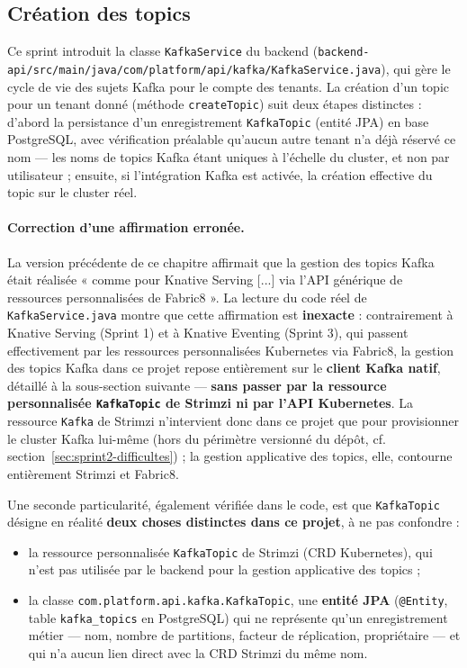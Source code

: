 \subsection{Création des topics}

Ce sprint introduit la classe \texttt{KafkaService} du backend (\texttt{backend-api/src/main/java/com/platform/api/kafka/KafkaService.java}), qui gère le cycle de vie des sujets Kafka pour le compte des tenants. La création d'un topic pour un tenant donné (méthode \texttt{createTopic}) suit deux étapes distinctes : d'abord la persistance d'un enregistrement \texttt{KafkaTopic} (entité JPA) en base PostgreSQL, avec vérification préalable qu'aucun autre tenant n'a déjà réservé ce nom — les noms de topics Kafka étant uniques à l'échelle du cluster, et non par utilisateur ; ensuite, si l'intégration Kafka est activée, la création effective du topic sur le cluster réel.

\paragraph{Correction d'une affirmation erronée.} La version précédente de ce chapitre affirmait que la gestion des topics Kafka était réalisée « comme pour Knative Serving [...] via l'API générique de ressources personnalisées de Fabric8 ». La lecture du code réel de \texttt{KafkaService.java} montre que cette affirmation est \textbf{inexacte} : contrairement à Knative Serving (Sprint 1) et à Knative Eventing (Sprint 3), qui passent effectivement par les ressources personnalisées Kubernetes via Fabric8, la gestion des topics Kafka dans ce projet repose entièrement sur le \textbf{client Kafka natif}, détaillé à la sous-section suivante — \textbf{sans passer par la ressource personnalisée \texttt{KafkaTopic} de Strimzi ni par l'API Kubernetes}. La ressource \texttt{Kafka} de Strimzi n'intervient donc dans ce projet que pour provisionner le cluster Kafka lui-même (hors du périmètre versionné du dépôt, cf. section~\ref{sec:sprint2-difficultes}) ; la gestion applicative des topics, elle, contourne entièrement Strimzi et Fabric8.

Une seconde particularité, également vérifiée dans le code, est que \texttt{KafkaTopic} désigne en réalité \textbf{deux choses distinctes dans ce projet}, à ne pas confondre :
\begin{itemize}
    \item la ressource personnalisée \texttt{KafkaTopic} de Strimzi (CRD Kubernetes), qui n'est pas utilisée par le backend pour la gestion applicative des topics ;
    \item la classe \texttt{com.platform.api.kafka.KafkaTopic}, une \textbf{entité JPA} (\texttt{@Entity}, table \texttt{kafka\_topics} en PostgreSQL) qui ne représente qu'un enregistrement métier — nom, nombre de partitions, facteur de réplication, propriétaire — et qui n'a aucun lien direct avec la CRD Strimzi du même nom.
\end{itemize}


